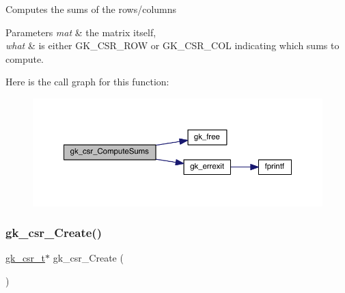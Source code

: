Computes the sums of the rows/columns 
\begin{DoxyParams}{Parameters}
{\em mat} & the matrix itself, \\
\hline
{\em what} & is either G\+K\+\_\+\+C\+S\+R\+\_\+\+R\+OW or G\+K\+\_\+\+C\+S\+R\+\_\+\+C\+OL indicating which sums to compute. \\
\hline
\end{DoxyParams}
Here is the call graph for this function\+:\nopagebreak
\begin{figure}[H]
\begin{center}
\leavevmode
\includegraphics[width=350pt]{a00077_a3cc2a64b0ead1b41ad824bc9401f1b84_cgraph}
\end{center}
\end{figure}
\mbox{\label{a00077_a82b885bbed5bd18c26629c35ce5d37e4}} 
\subsubsection{\texorpdfstring{gk\+\_\+csr\+\_\+\+Create()}{gk\_csr\_Create()}}
{\footnotesize\ttfamily \hyperlink{a00634}{gk\+\_\+csr\+\_\+t}$\ast$ gk\+\_\+csr\+\_\+\+Create (\begin{DoxyParamCaption}{ }\end{DoxyParamCaption})}

